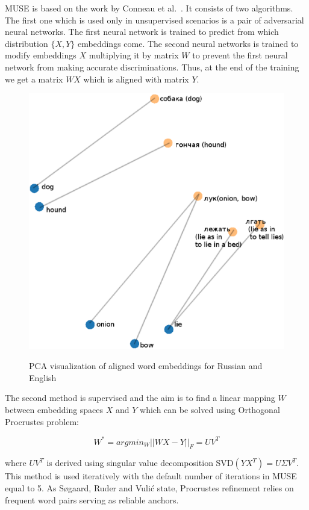 \documentclass[conference]{IEEEtran}
\begin{document}
	MUSE is based on the work by Conneau et al.~\cite{muse}. It consists of two algorithms. The first one which is used only in unsupervised scenarios is a pair of adversarial neural networks. The first neural network is trained to predict from which distribution $\{X, Y\}$ embeddings come. The second neural networks is trained to modify embeddings $X$ multiplying it by matrix $W$ to prevent the first neural network from making accurate discriminations. Thus, at the end of the training we get a matrix $WX$ which is aligned with matrix $Y$.
	
	\begin{figure}
		
		\centering
		\small
		\includegraphics[scale=0.4]{wordvectors}\\
		
		\caption{PCA visualization of aligned word embeddings for Russian and English}
		\label{wordvectors}
	\end{figure}
	
	
	The second method is supervised and the aim is to find a linear mapping $W$ between embedding spaces $X$ and $Y$ which can be solved using Orthogonal Procrustes problem:
	
	$$ W^* = argmin_W ||WX - Y||_F = UV^T$$
	
	where $UV^T$ is derived using singular value decomposition SVD$(YX^T) = U \Sigma V^T$.
	This method is used iteratively with the default number of iterations in MUSE equal to 5. As S{\o}gaard, Ruder and Vulić state, Procrustes refinement relies on frequent word pairs serving as reliable anchors.
	
\end{document}
